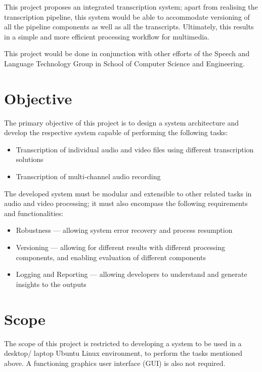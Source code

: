 This project proposes an integrated transcription system; apart from realising
the transcription pipeline, this system would be able to accommodate versioning
of all the pipeline components as well as all the transcripts. Ultimately, this
results in a simple and more efficient processing workflow for multimedia.

This project would be done in conjunction with other efforts of the Speech and
Language Technology Group in School of Computer Science and Engineering.

\section{Objective}

The primary objective of this project is to design a system architecture and
develop the respective system capable of performing the following tasks:

\begin{itemize}
    \item Transcription of individual audio and video files using different
    transcription solutions
    \item Transcription of multi-channel audio recording
\end{itemize}

The developed system must be modular and extensible to other related tasks
in audio and video processing; it must also encompass the following requirements
and functionalities:

\begin{itemize}
    \item Robustness --- allowing system error recovery and process resumption
    \item Versioning --- allowing for different results with different processing
    components, and enabling evaluation of different components
    \item Logging and Reporting --- allowing developers to understand and generate
    insights to the outputs
\end{itemize}

\section{Scope}

The scope of this project is restricted to developing a system to be used in a
desktop/ laptop Ubuntu Linux environment, to perform the tasks mentioned above. A
functioning graphics user interface (GUI) is also not required.

